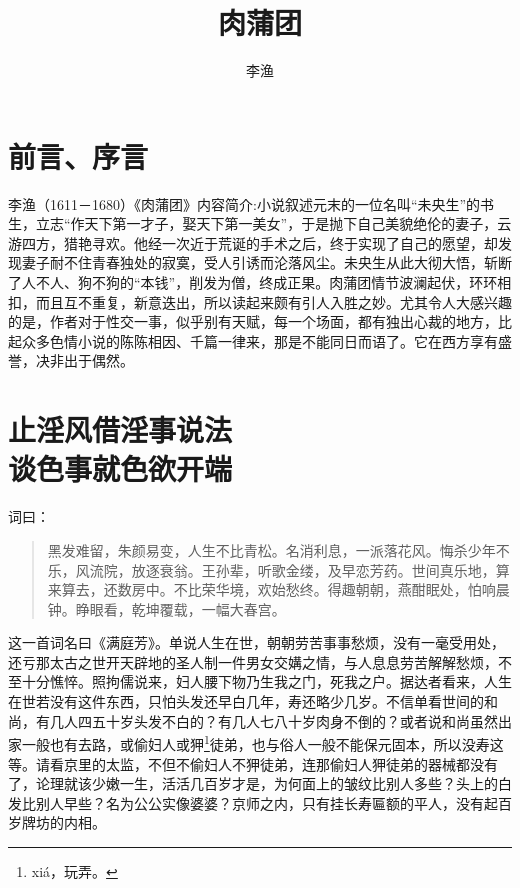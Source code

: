 \documentclass[a4paper,12pt,UTF8,twoside]{ctexbook}
\title{\heiti\zihao{0} 肉蒲团}
\author{李渔}
\date{}
\begin{document}
\maketitle
\tableofcontents

\frontmatter

\chapter{前言、序言}

李渔（1611－1680）《肉蒲团》内容简介:小说叙述元末的一位名叫“未央生”的书生，立志“作天下第一才子，娶天下第一美女”，于是抛下自己美貌绝伦的妻子，云游四方，猎艳寻欢。他经一次近于荒诞的手术之后，终于实现了自己的愿望，却发现妻子耐不住青春独处的寂寞，受人引诱而沦落风尘。未央生从此大彻大悟，斩断了人不人、狗不狗的“本钱”，削发为僧，终成正果。肉蒲团情节波澜起伏，环环相扣，而且互不重复，新意迭出，所以读起来颇有引人入胜之妙。尤其令人大感兴趣的是，作者对于性交一事，似乎别有天赋，每一个场面，都有独出心裁的地方，比起众多色情小说的陈陈相因、千篇一律来，那是不能同日而语了。它在西方享有盛誉，决非出于偶然。 

\mainmatter

\chapter[止淫风借淫事说法\ 谈色事就色欲开端]{止淫风借淫事说法\\谈色事就色欲开端}

词曰：

\begin{quotation}
黑发难留，朱颜易变，人生不比青松。名消利息，一派落花风。悔杀少年不乐，风流院，放逐衰翁。王孙辈，听歌金缕，及早恋芳药。世间真乐地，算来算去，还数房中。不比荣华境，欢始愁终。得趣朝朝，燕酣眠处，怕响晨钟。睁眼看，乾坤覆载，一幅大春宫。
\end{quotation}

这一首词名曰《满庭芳》。单说人生在世，朝朝劳苦事事愁烦，没有一毫受用处，还亏那太古之世开天辟地的圣人制一件男女交媾之情，与人息息劳苦解解愁烦，不至十分憔悴。照拘儒说来，妇人腰下物乃生我之门，死我之户。据达者看来，人生在世若没有这件东西，只怕头发还早白几年，寿还略少几岁。不信单看世间的和尚，有几人四五十岁头发不白的？有几人七八十岁肉身不倒的？或者说和尚虽然出家一般也有去路，或偷妇人或狎\footnote{xi\'a，玩弄。}徒弟，也与俗人一般不能保元固本，所以没寿这等。请看京里的太监，不但不偷妇人不狎徒弟，连那偷妇人狎徒弟的器械都没有了，论理就该少嫩一生，活活几百岁才是，为何面上的皱纹比别人多些？头上的白发比别人早些？名为公公实像婆婆？京师之内，只有挂长寿匾额的平人，没有起百岁牌坊的内相。
\end{document}

